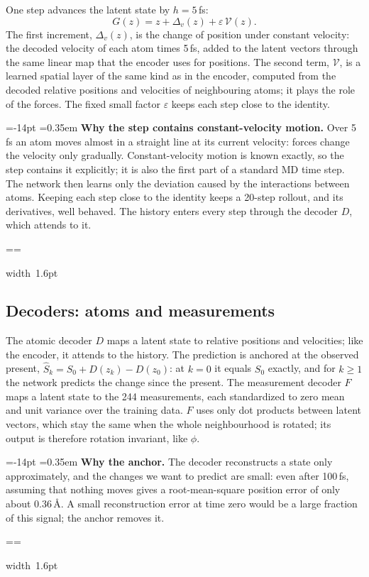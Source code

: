 \documentclass[11pt,a4paper]{article}
\makeatletter
\numberwithin{equation}{section}
\newcommand{\pcmWhyPiece}[1]{%
  \noindent\hbox{{\color{pcmAmber}\vrule width 1.6pt}%
    \setlength{\fboxsep}{7pt}\colorbox{pcmAmber!5}{\vbox{\unvbox#1}}}\par}
\newcommand{\pcmWhyEmit}{%
  \vbadness=10000
  \loop
    \par
    \ifdim\pagegoal=\maxdimen
      \pcmWhyAvail=\dimexpr\vsize-14pt\relax
    \else
      \pcmWhyAvail=\dimexpr\pagegoal-\pagetotal-19pt\relax
    \fi
    \ifdim\dimexpr\ht\pcmWhyAll+\dp\pcmWhyAll\relax>\pcmWhyAvail
      \ifdim\pcmWhyAvail<3\baselineskip
        \newpage
      \else
        \setbox\pcmWhyPart\vsplit\pcmWhyAll to \pcmWhyAvail
        \pcmWhyPiece\pcmWhyPart
      \fi
    \else
      \pcmWhyPiece\pcmWhyAll
    \fi
  \ifvoid\pcmWhyAll\else\repeat}
\newenvironment{why}[1][Why]{%
  \par\addvspace{.55em}%
  \setbox\pcmWhyAll\vbox\bgroup
    \hsize=\dimexpr\linewidth-1.6pt-14pt\relax
    \@parboxrestore\fussy
    \parskip=0.35em\relax
    \noindent\textcolor{pcmAmber}{\bfseries #1.}\enspace\ignorespaces}%
 {\par\egroup
  \splittopskip=\topskip\splitmaxdepth=\maxdepth
  \pcmWhyEmit
  \par\addvspace{.55em}}
\makeatother
\begin{document}
One step advances the latent state by $h=5$\,fs:
\begin{equation}
G(z)=z+\Delta_v(z)+\varepsilon\,\mathcal V(z).
\label{eq:step}
\end{equation}
The first increment, $\Delta_v(z)$, is the change of position under constant
velocity: the decoded velocity of each atom times 5\,fs, added to the latent
vectors through the same linear map that the encoder uses for positions. The second
term, $\mathcal V$, is a learned spatial layer of the same kind as in the encoder,
computed from the decoded relative positions and velocities of neighbouring atoms;
it plays the role of the forces. The fixed small factor $\varepsilon$ keeps each
step close to the identity.

\begin{why}[Why the step contains constant-velocity motion]
Over 5\,fs an atom moves almost in a straight line at its current velocity: forces
change the velocity only gradually. Constant-velocity motion is known exactly, so
the step contains it explicitly; it is also the first part of a standard MD time
step. The network then learns only the deviation caused by the interactions
between atoms. Keeping each step close to the identity keeps a 20-step rollout, and
its derivatives, well behaved. The history enters every step through the decoder
$D$, which attends to it.
\end{why}

\subsection{Decoders: atoms and measurements}

The atomic decoder $D$ maps a latent state to relative positions and velocities;
like the encoder, it attends to the history. The prediction is anchored at the
observed present, $\widehat S_k=S_0+D(z_k)-D(z_0)$: at $k=0$ it equals $S_0$
exactly, and for $k\ge1$ the network predicts the change since the present. The
measurement decoder $F$ maps a latent state to the 244 measurements, each
standardized to zero mean and unit variance over the training data. $F$ uses only
dot products between latent vectors, which stay the same when the whole
neighbourhood is rotated; its output is therefore rotation invariant, like $\phi$.

\begin{why}[Why the anchor]
The decoder reconstructs a state only approximately, and the changes we want to
predict are small: even after 100\,fs, assuming that nothing moves gives a
root-mean-square position error of only about 0.36\,\AA. A small reconstruction
error at time zero would be a large fraction of this signal; the anchor removes it.
\end{why}
\end{document}
